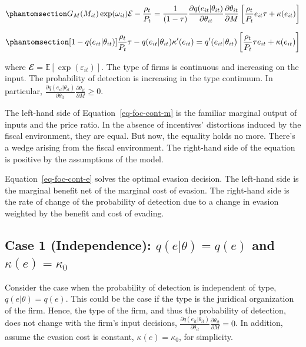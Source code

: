 \documentclass[
  12pt]{article}
\theoremstyle{definition}
\theoremstyle{remark}
\begin{document}
\begin{equation}\phantomsection\label{eq-foc-cont-m}{
G_M(M_{it})\exp(\omega_{it})\mathcal{E}-\frac{\rho_{t}}{P_t} = \frac{1}{(1-\tau)}\frac{\partial q(e_{it}|\theta_{it})}{\partial \theta_{it}}\frac{\partial \theta_{it}}{\partial M}\left[\frac{\rho_t}{P_t}e_{it}\tau+\kappa(e_{it})\right]
}\end{equation}

\begin{equation}\phantomsection\label{eq-foc-cont-e}{
[1-q(e_{it}|\theta_{it})]\frac{\rho_t}{P_t}\tau-q(e_{it}|\theta_{it})\kappa'(e_{it})=q'(e_{it}|\theta_{it})\left[\frac{\rho_t}{P_t}\tau e_{it} + \kappa(e_{it})\right]
}\end{equation}

where \(\mathbfcal{E}=\mathbb{E}[\exp(\varepsilon_{it})]\). The type of
firms is continuous and increasing on the input. The probability of
detection is increasing in the type continuum. In particular,
\(\frac{\partial q(e_{it}|\theta_{it})}{\partial \theta_{it}}\frac{\partial \theta_{it}}{\partial M}\ge0\).

The left-hand side of Equation~\ref{eq-foc-cont-m} is the familiar
marginal output of inputs and the price ratio. In the absence of
incentives' distortions induced by the fiscal environment, they are
equal. But now, the equality holds no more. There's a wedge arising from
the fiscal environment. The right-hand side of the equation is positive
by the assumptions of the model.

Equation~\ref{eq-foc-cont-e} solves the optimal evasion decision. The
left-hand side is the marginal benefit net of the marginal cost of
evasion. The right-hand side is the rate of change of the probability of
detection due to a change in evasion weighted by the benefit and cost of
evading.

\subsection{\texorpdfstring{Case 1 (Independence): \(q(e|\theta)=q(e)\)
and
\(\kappa(e)=\kappa_0\)}{Case 1 (Independence): q(e\textbar\textbackslash theta)=q(e) and \textbackslash kappa(e)=\textbackslash kappa\_0}}\label{case-1-independence-qethetaqe-and-kappaekappa_0}

Consider the case when the probability of detection is independent of
type, \(q(e|\theta)=q(e)\). This could be the case if the type is the
juridical organization of the firm. Hence, the type of the firm, and
thus the probability of detection, does not change with the firm's input
decisions,
\(\frac{\partial q(e_{it}|\theta_{it})}{\partial \theta_{it}}\frac{\partial \theta_{it}}{\partial M}=0\).
In addition, assume the evasion cost is constant,
\(\kappa(e)=\kappa_0\), for simplicity.
\end{document}

